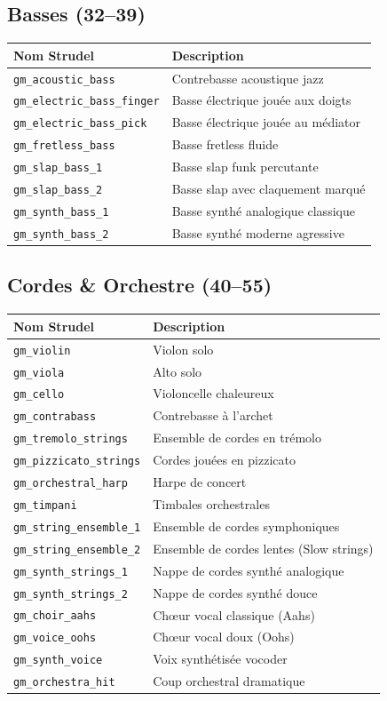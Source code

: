 \documentclass[a4paper,10pt]{article}
\begin{document}
\subsection{Basses (32--39)}
\begin{tabularx}{\linewidth}{|l|X|}
\hline
\textbf{Nom Strudel} & \textbf{Description} \\
\hline
\texttt{gm\_acoustic\_bass} & Contrebasse acoustique jazz \\
\texttt{gm\_electric\_bass\_finger} & Basse électrique jouée aux doigts \\
\texttt{gm\_electric\_bass\_pick} & Basse électrique jouée au médiator \\
\texttt{gm\_fretless\_bass} & Basse fretless fluide \\
\texttt{gm\_slap\_bass\_1} & Basse slap funk percutante \\
\texttt{gm\_slap\_bass\_2} & Basse slap avec claquement marqué \\
\texttt{gm\_synth\_bass\_1} & Basse synthé analogique classique \\
\texttt{gm\_synth\_bass\_2} & Basse synthé moderne agressive \\
\hline
\end{tabularx}

\subsection{Cordes \& Orchestre (40--55)}
\begin{tabularx}{\linewidth}{|l|X|}
\hline
\textbf{Nom Strudel} & \textbf{Description} \\
\hline
\texttt{gm\_violin} & Violon solo \\
\texttt{gm\_viola} & Alto solo \\
\texttt{gm\_cello} & Violoncelle chaleureux \\
\texttt{gm\_contrabass} & Contrebasse à l'archet \\
\texttt{gm\_tremolo\_strings} & Ensemble de cordes en trémolo \\
\texttt{gm\_pizzicato\_strings} & Cordes jouées en pizzicato \\
\texttt{gm\_orchestral\_harp} & Harpe de concert \\
\texttt{gm\_timpani} & Timbales orchestrales \\
\texttt{gm\_string\_ensemble\_1} & Ensemble de cordes symphoniques \\
\texttt{gm\_string\_ensemble\_2} & Ensemble de cordes lentes (Slow strings) \\
\texttt{gm\_synth\_strings\_1} & Nappe de cordes synthé analogique \\
\texttt{gm\_synth\_strings\_2} & Nappe de cordes synthé douce \\
\texttt{gm\_choir\_aahs} & Chœur vocal classique (Aahs) \\
\texttt{gm\_voice\_oohs} & Chœur vocal doux (Oohs) \\
\texttt{gm\_synth\_voice} & Voix synthétisée vocoder \\
\texttt{gm\_orchestra\_hit} & Coup orchestral dramatique \\
\hline
\end{tabularx}
\end{document}
